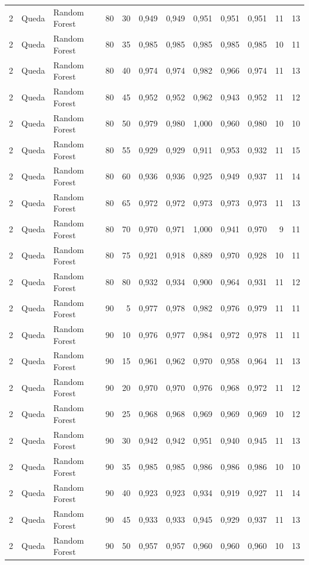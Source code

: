 \begin{longtable}{@{}rllrrrrrrrrr@{}}
2 & Queda & Random Forest & 80 & 30 & 0,949 & 0,949 & 0,951 & 0,951 & 0,951 & 11 & 13 \\
2 & Queda & Random Forest & 80 & 35 & 0,985 & 0,985 & 0,985 & 0,985 & 0,985 & 10 & 11 \\
2 & Queda & Random Forest & 80 & 40 & 0,974 & 0,974 & 0,982 & 0,966 & 0,974 & 11 & 13 \\
2 & Queda & Random Forest & 80 & 45 & 0,952 & 0,952 & 0,962 & 0,943 & 0,952 & 11 & 12 \\
2 & Queda & Random Forest & 80 & 50 & 0,979 & 0,980 & 1,000 & 0,960 & 0,980 & 10 & 10 \\
2 & Queda & Random Forest & 80 & 55 & 0,929 & 0,929 & 0,911 & 0,953 & 0,932 & 11 & 15 \\
2 & Queda & Random Forest & 80 & 60 & 0,936 & 0,936 & 0,925 & 0,949 & 0,937 & 11 & 14 \\
2 & Queda & Random Forest & 80 & 65 & 0,972 & 0,972 & 0,973 & 0,973 & 0,973 & 11 & 13 \\
2 & Queda & Random Forest & 80 & 70 & 0,970 & 0,971 & 1,000 & 0,941 & 0,970 & 9 & 11 \\
2 & Queda & Random Forest & 80 & 75 & 0,921 & 0,918 & 0,889 & 0,970 & 0,928 & 10 & 11 \\
2 & Queda & Random Forest & 80 & 80 & 0,932 & 0,934 & 0,900 & 0,964 & 0,931 & 11 & 12 \\
2 & Queda & Random Forest & 90 & 5 & 0,977 & 0,978 & 0,982 & 0,976 & 0,979 & 11 & 11 \\
2 & Queda & Random Forest & 90 & 10 & 0,976 & 0,977 & 0,984 & 0,972 & 0,978 & 11 & 11 \\
2 & Queda & Random Forest & 90 & 15 & 0,961 & 0,962 & 0,970 & 0,958 & 0,964 & 11 & 13 \\
2 & Queda & Random Forest & 90 & 20 & 0,970 & 0,970 & 0,976 & 0,968 & 0,972 & 11 & 12 \\
2 & Queda & Random Forest & 90 & 25 & 0,968 & 0,968 & 0,969 & 0,969 & 0,969 & 10 & 12 \\
2 & Queda & Random Forest & 90 & 30 & 0,942 & 0,942 & 0,951 & 0,940 & 0,945 & 11 & 13 \\
2 & Queda & Random Forest & 90 & 35 & 0,985 & 0,985 & 0,986 & 0,986 & 0,986 & 10 & 10 \\
2 & Queda & Random Forest & 90 & 40 & 0,923 & 0,923 & 0,934 & 0,919 & 0,927 & 11 & 14 \\
2 & Queda & Random Forest & 90 & 45 & 0,933 & 0,933 & 0,945 & 0,929 & 0,937 & 11 & 13 \\
2 & Queda & Random Forest & 90 & 50 & 0,957 & 0,957 & 0,960 & 0,960 & 0,960 & 10 & 13 \\

\end{longtable}
